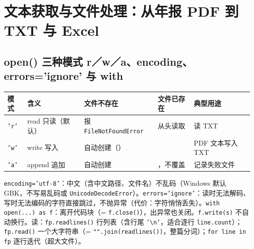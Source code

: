 \section{文本获取与文件处理：从年报 PDF 到 TXT 与 Excel}

\subsection{open() 三种模式 r／w／a、encoding、errors='ignore' 与 with}
\begin{tabD08a}
\begin{tabularx}{\linewidth}{@{}p{0.9cm}p{2.4cm}p{3.6cm}p{2.8cm}L@{}}
\toprule
模式 & 含义 & 文件不存在 & 文件已存在 & 典型用途 \\
\midrule
\texttt{'r'} & read 只读（默认）& 报 \texttt{FileNotFoundError} & 从头读取 & 读 TXT \\
\texttt{'w'} & write 写入 & 自动创建（）& \leavevmode{} & PDF 文本写入 TXT \\
\texttt{'a'} & append 追加 & 自动创建 & \leavevmode{}，不覆盖 & 记录失败文件 \\
\bottomrule
\end{tabularx}
\end{tabD08a}
\texttt{encoding='utf-8'}：中文（含中文路径、文件名）不乱码（Windows 默认 GBK，不写易乱码或 \texttt{UnicodeDecodeError}）。\texttt{errors='ignore'}：读时无法解码、写时无法编码的字符直接跳过，不抛异常（代价：字符悄悄丢失）。\texttt{with open(...) as f}：离开代码块（= \texttt{f.close()}），出异常也关闭。\texttt{f.write(s)} 不自动换行。读：\texttt{fp.readlines()} 行列表（含行尾 \texttt{'\textbackslash n'}，适合逐行 \texttt{line.count}）；\texttt{fp.read()} 一个大字符串（= \texttt{"".join(readlines())}，整篇分词）；\texttt{for line in fp} 逐行迭代（超大文件）。

